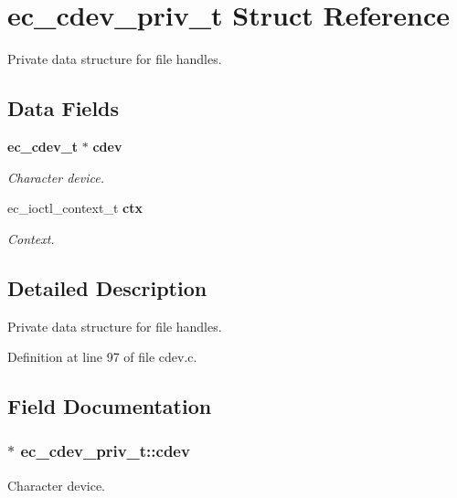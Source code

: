 \section{ec\-\_\-cdev\-\_\-priv\-\_\-t \-Struct \-Reference}
\label{structec__cdev__priv__t}


\-Private data structure for file handles.  


\subsection*{\-Data \-Fields}
\begin{DoxyCompactItemize}
\item 
{\bf ec\-\_\-cdev\-\_\-t} $\ast$ {\bf cdev}
\begin{DoxyCompactList}\small\item\em \-Character device. \end{DoxyCompactList}\item 
ec\-\_\-ioctl\-\_\-context\-\_\-t {\bf ctx}
\begin{DoxyCompactList}\small\item\em \-Context. \end{DoxyCompactList}\end{DoxyCompactItemize}


\subsection{\-Detailed \-Description}
\-Private data structure for file handles. 

\-Definition at line 97 of file cdev.\-c.



\subsection{\-Field \-Documentation}
\subsubsection[{cdev}]{$\ast$ {\bf ec\-\_\-cdev\-\_\-priv\-\_\-t\-::cdev}}\label{structec__cdev__priv__t_a4b14b3ffbcd6f71b1b38c82a5b046992}


\-Character device. 



